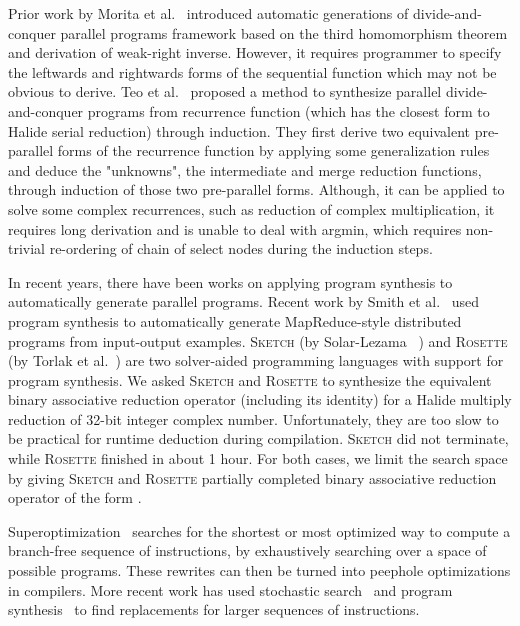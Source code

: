 Prior work by Morita et al.~\cite{Morita:2007:AIG:1250734.1250752} introduced automatic generations of divide-and-conquer parallel programs framework based on the third homomorphism theorem and derivation of weak-right inverse. However, it requires programmer to specify the leftwards and rightwards forms of the sequential function which may not be obvious to derive. Teo et al.~\cite{Teo:1997:DEP:266670.266697} proposed a method to synthesize parallel divide-and-conquer
programs from recurrence function (which has the closest form to Halide serial reduction) through induction. They first derive two equivalent pre-parallel forms of the recurrence function by applying some generalization rules and deduce the "unknowns", the intermediate and merge reduction functions, through induction of those two pre-parallel forms. Although, it can be applied to solve some complex recurrences, such as reduction of complex multiplication, it requires long derivation and is unable to deal with argmin, which requires non-trivial re-ordering of chain of select nodes during the induction steps. 

In recent years, there have been works on applying program synthesis to automatically generate parallel programs. Recent work by Smith et al.~\cite{Smith:2016:MPS:2908080.2908102} used program synthesis to automatically generate MapReduce-style distributed programs from input-output examples. \textsc{Sketch} (by Solar-Lezama ~\cite{Solar-Lezama:2008:PSS:1714168}) and \textsc{Rosette} (by Torlak et al.~\cite{Torlak:2013:GSL:2509578.2509586}) are two solver-aided programming languages with support for program synthesis. We asked \textsc{Sketch} and \textsc{Rosette} to synthesize the equivalent binary associative reduction operator (including its identity) for a Halide multiply reduction of 32-bit integer complex number. Unfortunately, they are too slow to be practical for runtime deduction during compilation. \textsc{Sketch} did not terminate, while \textsc{Rosette} finished in about 1 hour. For both cases, we limit the search space by giving \textsc{Sketch} and \textsc{Rosette} partially completed binary associative reduction operator of the form . 

Superoptimization~\cite{Granlund:1992:EBU:143095.143146, Massalin:1987:SLS:36206.36194} searches for the shortest or most optimized way to compute a branch-free sequence of instructions, by exhaustively searching over a space of possible programs. These rewrites can then be turned into peephole optimizations in compilers. More recent work has used stochastic search~\cite{Phothilimthana:2016:SUS:2872362.2872387, Schkufza:2013:SS:2490301.2451150} and program synthesis~\cite{Lopes:2015:PCP:2737924.2737965} to find replacements for larger sequences of instructions. 

